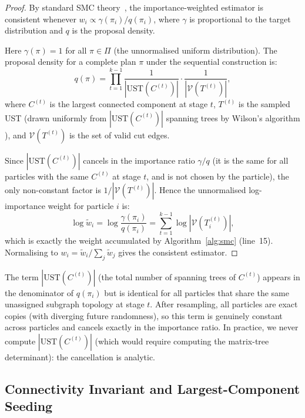 \begin{proof}
By standard SMC theory~\citep{delmoral2004}, the importance-weighted estimator
is consistent whenever $w_i \propto \gamma(\pi_i) / q(\pi_i)$, where
$\gamma$ is proportional to the target distribution and $q$ is the proposal
density.

Here $\gamma(\pi) = 1$ for all $\pi \in \Pi$ (the unnormalised uniform
distribution).
The proposal density for a complete plan $\pi$ under the sequential
construction is:
\[
  q(\pi)
  = \prod_{t=1}^{k-1} \frac{1}{|\mathrm{UST}(C^{(t)})|} \cdot
    \frac{1}{|\mathcal{V}(T^{(t)})|},
\]
where $C^{(t)}$ is the largest connected component at stage $t$,
$T^{(t)}$ is the sampled UST (drawn uniformly from
$|\mathrm{UST}(C^{(t)})|$ spanning trees by Wilson's algorithm
\citep{wilson1996,aldous1991}), and $\mathcal{V}(T^{(t)})$ is the set of
valid cut edges.

Since $|\mathrm{UST}(C^{(t)})|$ cancels in the importance ratio
$\gamma/q$ (it is the same for all particles with the same $C^{(t)}$ at
stage $t$, and is not chosen by the particle), the only non-constant factor is
$1/|\mathcal{V}(T^{(t)})|$.
Hence the unnormalised log-importance weight for particle $i$ is:
\[
  \log \tilde{w}_i
  = \log \frac{\gamma(\pi_i)}{q(\pi_i)}
  = \sum_{t=1}^{k-1} \log|\mathcal{V}(T_i^{(t)})|,
\]
which is exactly the weight accumulated by Algorithm~\ref{alg:smc}
(line~15).
Normalising to $w_i = \tilde{w}_i / \sum_j \tilde{w}_j$ gives the consistent
estimator.
\end{proof}

\begin{remark}
The term $|\mathrm{UST}(C^{(t)})|$ (the total number of spanning trees of
$C^{(t)}$) appears in the denominator of $q(\pi_i)$ but is identical for all
particles that share the same unassigned subgraph topology at stage $t$.
After resampling, all particles are exact copies (with diverging future
randomness), so this term is genuinely constant across particles and cancels
exactly in the importance ratio.
In practice, we never compute $|\mathrm{UST}(C^{(t)})|$ (which would require
computing the matrix-tree determinant): the cancellation is analytic.
\end{remark}

\subsection{Connectivity Invariant and Largest-Component Seeding}
\label{subsec:connectivity-invariant}

